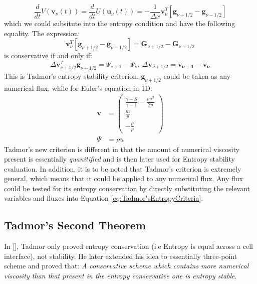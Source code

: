 \documentclass[a4paper]{article}
\numberwithin{equation}{section}
\begin{document}
\begin{equation}\label{eq:Convert1}
    \frac{d}{dt}V(\mathbf{v}_\nu(t)) = \frac{d}{dt} U(\mathbf{u}_\nu(t)) = -\frac{1}{\Delta x} \mathbf{v}_\nu^T \left[\mathbf{g}_{\nu + 1/2} - \mathbf{g}_{\nu - 1/2}\right]
\end{equation}
which we could subsitute into the entropy condition and have the following equality. The expression:
\begin{equation}\label{eq:Convert2}
    \mathbf{v}_\nu^T \left[\mathbf{g}_{\nu + 1/2} - \mathbf{g}_{\nu - 1/2} \right] = \mathbf{G}_{\nu + 1/2} - \mathbf{G}_{\nu - 1/2}
\end{equation}
is conservative if and only if:
\begin{equation}\label{eq:Tadmor'sEntropyCriteria}
    \Delta \mathbf{v}_{\nu + 1/2}^T \mathbf{g}_{\nu + 1/2} = \Psi_{\nu + 1} - \Psi_\nu, \ \Delta \mathbf{v}_{\nu + 1/2} = \mathbf{v_{\nu + 1}} - \mathbf{v}_\mathbf{\nu}
\end{equation}
This is Tadmor's entropy stability criterion. $\mathbf{g}_{\nu + 1/2}$ could be taken as any numerical flux, while for Euler's equation in 1D:
\begin{equation}
    \begin{split}
        \mathbf{v} &= 
        \begin{pmatrix}
            \frac{\gamma - S}{\gamma - 1}-\frac{\rho u^2}{2p} \\
            \frac{m}{p}\\
            -\frac{\rho}{p}
        \end{pmatrix}\\
        \Psi &= \rho u
    \end{split}
\end{equation} 
Tadmor's new criterion is different in that the amount of numerical viscosity present is essentially \textit{quanitified} and is then later used for Entropy stability evaluation. In addition, it is to be noted that Tadmor's criterion is extremely general, which means that it could be applied to any numerical flux. Any flux could be tested for its entropy conservation by directly substituting the relevant variables and fluxes into Equation \ref{eq:Tadmor'sEntropyCriteria}.


\subsection{Tadmor's Second Theorem}
In [], Tadmor only proved entropy conservation (i.e Entropy is equal across a cell interface), not stability. He later extended his idea to essentially three-point scheme and proved that: \textit{A conservative scheme which contains more numerical viscosity than that present in the entropy conservative one is entropy stable}. 
\end{document}
